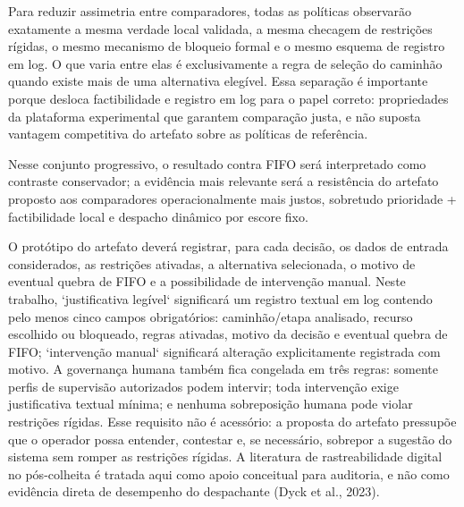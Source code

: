 \documentclass[
  12pt,
  oneside,
  a4paper,
  sumario=tradicional,
  brazil
]{abntex2}
\begin{document}
Para reduzir assimetria entre comparadores, todas as pol\'iticas observar\~ao exatamente a mesma verdade local validada, a mesma checagem de restri\c{c}\~oes r\'igidas, o mesmo mecanismo de bloqueio formal e o mesmo esquema de registro em log. O que varia entre elas \'e exclusivamente a regra de sele\c{c}\~ao do caminh\~ao quando existe mais de uma alternativa eleg\'ivel. Essa separa\c{c}\~ao \'e importante porque desloca factibilidade e registro em log para o papel correto: propriedades da plataforma experimental que garantem compara\c{c}\~ao justa, e n\~ao suposta vantagem competitiva do artefato sobre as pol\'iticas de refer\^encia.

Nesse conjunto progressivo, o resultado contra FIFO ser\'a interpretado como contraste conservador; a evid\^encia mais relevante ser\'a a resist\^encia do artefato proposto aos comparadores operacionalmente mais justos, sobretudo prioridade + factibilidade local e despacho din\^amico por escore fixo.

O prot\'otipo do artefato dever\'a registrar, para cada decis\~ao, os dados de entrada considerados, as restri\c{c}\~oes ativadas, a alternativa selecionada, o motivo de eventual quebra de FIFO e a possibilidade de interven\c{c}\~ao manual. Neste trabalho, `justificativa leg\'ivel` significar\'a um registro textual em log contendo pelo menos cinco campos obrigat\'orios: caminh\~ao/etapa analisado, recurso escolhido ou bloqueado, regras ativadas, motivo da decis\~ao e eventual quebra de FIFO; `interven\c{c}\~ao manual` significar\'a altera\c{c}\~ao explicitamente registrada com motivo. A governan\c{c}a humana tamb\'em fica congelada em tr\^es regras: somente perfis de supervis\~ao autorizados podem intervir; toda interven\c{c}\~ao exige justificativa textual m\'inima; e nenhuma sobreposi\c{c}\~ao humana pode violar restri\c{c}\~oes r\'igidas. Esse requisito n\~ao \'e acess\'orio: a proposta do artefato pressup\~oe que o operador possa entender, contestar e, se necess\'ario, sobrepor a sugest\~ao do sistema sem romper as restri\c{c}\~oes r\'igidas. A literatura de rastreabilidade digital no p\'os-colheita \'e tratada aqui como apoio conceitual para auditoria, e n\~ao como evid\^encia direta de desempenho do despachante (Dyck et al., 2023).
\end{document}
